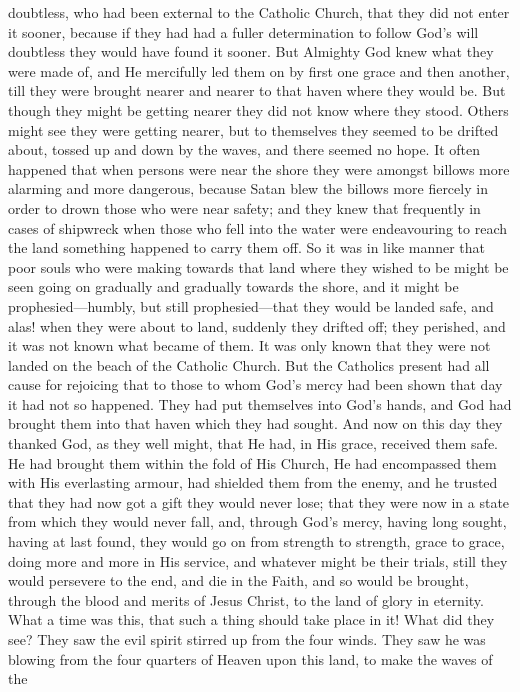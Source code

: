 doubtless, who had been external to the Catholic Church, that they did
not enter it sooner, because if they had had a fuller determination to
follow God's will doubtless they would have found it sooner. But
Almighty God knew what they were made of, and He mercifully led them
on by first one grace and then another, till they were brought nearer
and nearer to that haven where they would be. But though they might be
getting nearer they did not know where they stood. Others might see
they were getting nearer, but to themselves they seemed to be drifted
about, tossed up and down by the waves, and there seemed no hope. It
often happened that when persons were near the shore they were amongst
billows more alarming and more dangerous, because Satan blew the
billows more fiercely in order to drown those who were near safety;
and they knew that frequently in cases of shipwreck when those who
fell into the water were endeavouring to reach the land something
happened to carry them off. So it was in like manner that poor souls
who were making towards that land where they wished to be might be
seen going on gradually and gradually towards the shore, and it might
be prophesied—humbly, but still prophesied—that they would be
landed safe, and alas! when they were about to land, suddenly they
drifted off; they perished, and it was not known what became of them.
It was only known that they were not landed on the beach of the
Catholic Church. But the Catholics present had all cause for rejoicing
that to those to whom God's mercy had been shown that day it had not
so happened. They had put themselves into God's hands, and God had
brought them into that haven which they had sought. And now on this
day they thanked God, as they well might, that He had, in His grace,
received them safe. He had brought them within the fold of His Church,
He had encompassed them with His everlasting armour, had shielded them
from the enemy, and he trusted that they had now got a gift they would
never lose; that they were now in a state from which they would
never fall, and, through God's mercy, having long sought, having at
last found, they would go on from strength to strength, grace to
grace, doing more and more in His service, and whatever might be their
trials, still they would persevere to the end, and die in the Faith,
and so would be brought, through the blood and merits of Jesus Christ,
to the land of glory in eternity. What a time was this, that such a
thing should take place in it! What did they see? They saw the evil
spirit stirred up from the four winds. They saw he was blowing from
the four quarters of Heaven upon this land, to make the waves of the
